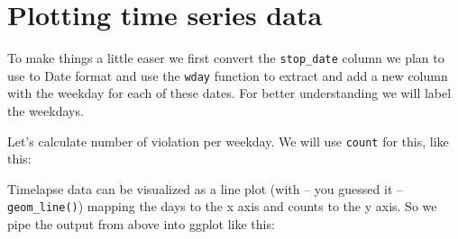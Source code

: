 \documentclass[]{book}
\newenvironment{Shaded}{\begin{snugshade}}{\end{snugshade}}
\newcommand{\DataTypeTok}[1]{\textcolor[rgb]{0.13,0.29,0.53}{#1}}
\newcommand{\KeywordTok}[1]{\textcolor[rgb]{0.13,0.29,0.53}{\textbf{#1}}}
\newcommand{\NormalTok}[1]{#1}
\newcommand{\OperatorTok}[1]{\textcolor[rgb]{0.81,0.36,0.00}{\textbf{#1}}}
\newcommand{\OtherTok}[1]{\textcolor[rgb]{0.56,0.35,0.01}{#1}}
\newcommand{\StringTok}[1]{\textcolor[rgb]{0.31,0.60,0.02}{#1}}
\begin{document}
\hypertarget{plotting-time-series-data}{%
\section{Plotting time series data}\label{plotting-time-series-data}}

To make things a little easer we first convert the \texttt{stop\_date} column we plan to use to Date format and use the \texttt{wday} function to extract and add a new column with the weekday for each of these dates. For better understanding we will label the weekdays.

\begin{Shaded}
\end{Shaded}

Let's calculate number of violation per weekday. We will use \texttt{count} for this, like this:

\begin{Shaded}
\end{Shaded}

Timelapse data can be visualized as a line plot (with -- you guessed it -- \texttt{geom\_line()}) mapping the days to the x axis and counts to the y axis. So we pipe the output from above into ggplot like this:

\begin{Shaded}
\end{Shaded}
\end{document}
